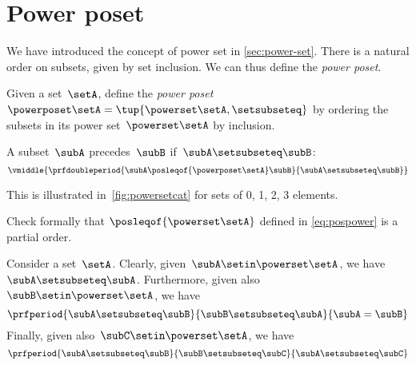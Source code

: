 \section{Power poset}

We have introduced the concept of power set in \cref{sec:power-set}.
There is a natural order on subsets, given by set inclusion.
We can thus define the \emph{power poset}.

\begin{definition}
    \label{def:power-poset}
    Given a set~$\setA$,
    define the \emph{power poset}~$\powerposet\setA = \tup{\powerset\setA,\setsubseteq}$ by ordering the subsets in its power set~$\powerset\setA$ by inclusion.

    A subset~$\subA$ precedes~$\subB$ if~$\subA \setsubseteq \subB$:
    \begin{equation}
        \label{eq:pospower}
        \vmiddle{
            \prfdoubleperiod{
                \subA \posleqof{\powerposet\setA} \subB
            }{
                \subA \setsubseteq \subB
            }
        }
    \end{equation}
\end{definition}
This is illustrated in~\cref{fig:powersetcat} for sets of 0, 1, 2, 3 elements.
\begin{exercise}
    Check formally that $\posleqof{\powerset\setA}$ defined in \cref{eq:pospower} is a partial order.
\end{exercise}
\begin{solution}
    Consider a set~$\setA$.
    Clearly, given~$\subA\setin \powerset \setA$, we have~$\subA\setsubseteq \subA$.
    Furthermore, given also~$\subB\setin \powerset \setA$, we have
    \begin{equation}
        \prfperiod{\subA\setsubseteq \subB}{\subB\setsubseteq \subA}{\subA=\subB}
    \end{equation}
    Finally, given also~$\subC\setin \powerset \setA$, we have
    \begin{equation}
        \prfperiod{\subA\setsubseteq \subB}{\subB\setsubseteq \subC}{\subA\setsubseteq\subC}
    \end{equation}
\end{solution}
\vfill
\begin{figure*}[h]
    \centering
    \hfill
    \hfill
    \hfill
    \caption{Power set as a poset.
    }
    \label{fig:powersetcat}
\end{figure*}
\vfill
